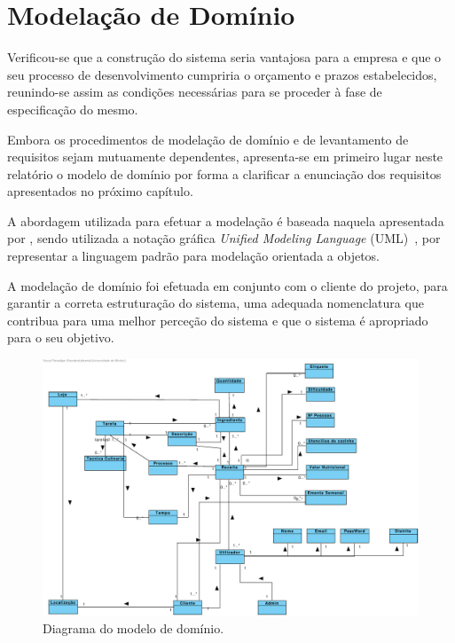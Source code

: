 
\section{Modelação de Domínio}
\label{cap:dominio}

Verificou-se que a construção do sistema seria vantajosa para a empresa e que o seu processo de desenvolvimento cumpriria o orçamento e prazos estabelecidos, reunindo-se assim as condições necessárias para se proceder à fase de especificação do mesmo.

Embora os procedimentos de modelação de domínio e de levantamento de requisitos sejam mutuamente dependentes, apresenta-se em primeiro lugar neste relatório o modelo de domínio por forma a clarificar a enunciação dos requisitos apresentados no próximo capítulo.

A abordagem utilizada para efetuar a modelação é baseada naquela apresentada por \textcite{sommerville2010software}, sendo utilizada a notação gráfica \emph{Unified Modeling Language} (UML)~\parencite{omg2017uml}, por representar a linguagem padrão para modelação orientada a objetos. 

A modelação de domínio foi efetuada em conjunto com o cliente do projeto, para garantir a correta estruturação do sistema, uma adequada nomenclatura que contribua para uma melhor perceção do sistema e que o sistema é apropriado para o seu objetivo.

\begin{figure}[ht]
  \centering
  \includegraphics[width=\textwidth]{figures/04/diagrama-dominio.pdf}
  \caption{Diagrama do modelo de domínio.}
  \label{fig:dominio:diagrama}
\end{figure}

